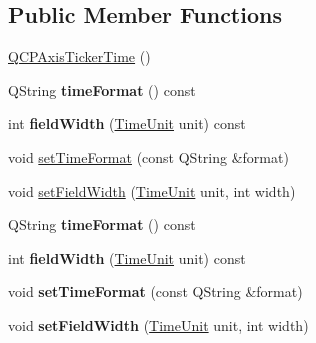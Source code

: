 \subsection*{Public Member Functions}
\begin{DoxyCompactItemize}
\item 
\hyperlink{class_q_c_p_axis_ticker_time_a5145aac1d2117fdac411d9e8552cc41b}{Q\+C\+P\+Axis\+Ticker\+Time} ()
\item 
\mbox{\label{class_q_c_p_axis_ticker_time_a99ad61dc7434a7fed1850e96bf748834}} 
Q\+String {\bfseries time\+Format} () const
\item 
\mbox{\label{class_q_c_p_axis_ticker_time_a6b58a98e4d64c6764aa61a707e4a344d}} 
int {\bfseries field\+Width} (\hyperlink{class_q_c_p_axis_ticker_time_a5c48ded8c6d3a1aca9b68219469fea3e}{Time\+Unit} unit) const
\item 
void \hyperlink{class_q_c_p_axis_ticker_time_a2f30b6e5125bce4256be9ce3177088ea}{set\+Time\+Format} (const Q\+String \&format)
\item 
void \hyperlink{class_q_c_p_axis_ticker_time_adc13e54fc969be98a5c0e3fa0dbaa293}{set\+Field\+Width} (\hyperlink{class_q_c_p_axis_ticker_time_a5c48ded8c6d3a1aca9b68219469fea3e}{Time\+Unit} unit, int width)
\item 
\mbox{\label{class_q_c_p_axis_ticker_time_a99ad61dc7434a7fed1850e96bf748834}} 
Q\+String {\bfseries time\+Format} () const
\item 
\mbox{\label{class_q_c_p_axis_ticker_time_a6b58a98e4d64c6764aa61a707e4a344d}} 
int {\bfseries field\+Width} (\hyperlink{class_q_c_p_axis_ticker_time_a5c48ded8c6d3a1aca9b68219469fea3e}{Time\+Unit} unit) const
\item 
\mbox{\label{class_q_c_p_axis_ticker_time_a2f30b6e5125bce4256be9ce3177088ea}} 
void {\bfseries set\+Time\+Format} (const Q\+String \&format)
\item 
\mbox{\label{class_q_c_p_axis_ticker_time_adc13e54fc969be98a5c0e3fa0dbaa293}} 
void {\bfseries set\+Field\+Width} (\hyperlink{class_q_c_p_axis_ticker_time_a5c48ded8c6d3a1aca9b68219469fea3e}{Time\+Unit} unit, int width)
\end{DoxyCompactItemize}
